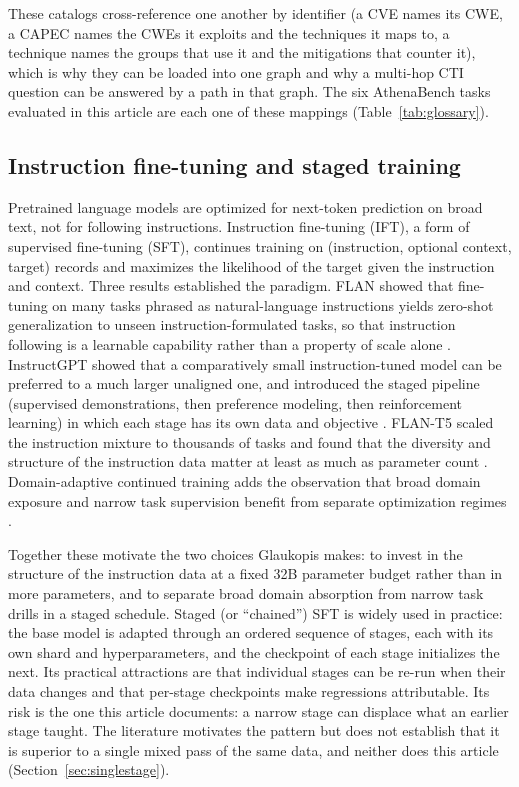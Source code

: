 \documentclass[twocolumn]{svjour3}
\begin{document}
These catalogs cross-reference one another by identifier (a CVE names its CWE, a CAPEC names the CWEs it exploits and the techniques it maps to, a technique names the groups that use it and the mitigations that counter it), which is why they can be loaded into one graph and why a multi-hop CTI question can be answered by a path in that graph. The six AthenaBench tasks evaluated in this article are each one of these mappings (Table~\ref{tab:glossary}).

\subsection{Instruction fine-tuning and staged training}\label{sec:bg-ift}
Pretrained language models are optimized for next-token prediction on broad text, not for following instructions. Instruction fine-tuning (IFT), a form of supervised fine-tuning (SFT), continues training on (instruction, optional context, target) records and maximizes the likelihood of the target given the instruction and context. Three results established the paradigm. FLAN showed that fine-tuning on many tasks phrased as natural-language instructions yields zero-shot generalization to unseen instruction-formulated tasks, so that instruction following is a learnable capability rather than a property of scale alone \cite{wei2022flan}. InstructGPT showed that a comparatively small instruction-tuned model can be preferred to a much larger unaligned one, and introduced the staged pipeline (supervised demonstrations, then preference modeling, then reinforcement learning) in which each stage has its own data and objective \cite{ouyang2022instructgpt}. FLAN-T5 scaled the instruction mixture to thousands of tasks and found that the diversity and structure of the instruction data matter at least as much as parameter count \cite{chung2024flant5}. Domain-adaptive continued training adds the observation that broad domain exposure and narrow task supervision benefit from separate optimization regimes \cite{gururangan2020dontstop}.

Together these motivate the two choices Glaukopis makes: to invest in the structure of the instruction data at a fixed 32B parameter budget rather than in more parameters, and to separate broad domain absorption from narrow task drills in a staged schedule. Staged (or ``chained'') SFT is widely used in practice: the base model is adapted through an ordered sequence of stages, each with its own shard and hyperparameters, and the checkpoint of each stage initializes the next. Its practical attractions are that individual stages can be re-run when their data changes and that per-stage checkpoints make regressions attributable. Its risk is the one this article documents: a narrow stage can displace what an earlier stage taught. The literature motivates the pattern but does not establish that it is superior to a single mixed pass of the same data, and neither does this article (Section~\ref{sec:singlestage}).
\end{document}
